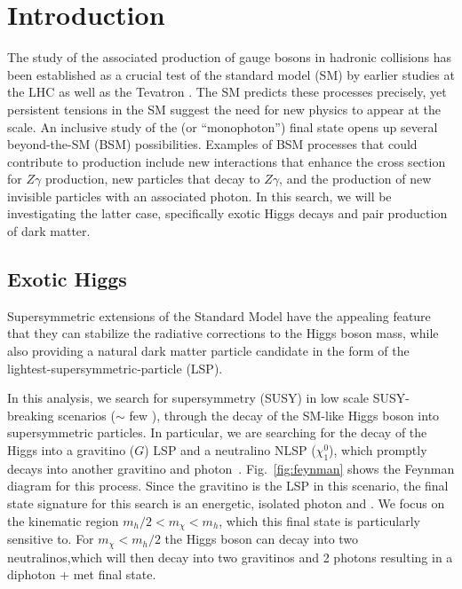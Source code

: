 \section{Introduction}

The study of the associated production of gauge bosons in hadronic collisions has been established as a crucial test of the standard model (SM) by earlier studies at the LHC as well as the Tevatron  \cite{d0zgg,d0zinv,cdfzgam,cmsvgam,cmsvhgam,atlasvgam,atlasww}. The SM predicts these processes precisely, yet persistent tensions in the SM suggest the need for new physics to appear at the \TeV scale. An inclusive study of the \gmet (or ``monophoton'') final state opens up several beyond-the-SM (BSM) possibilities. Examples of BSM processes that could contribute to \gmet production include new interactions that enhance the cross section for $Z\gamma$ production, new particles that decay to $Z\gamma$, and the production of new invisible particles with an associated photon.
In this search, we will be investigating the latter case, specifically exotic Higgs decays and pair production of dark matter.

\subsection{Exotic Higgs}

Supersymmetric extensions of the Standard Model have the appealing feature that they can stabilize the radiative corrections to the Higgs boson mass, while also providing a natural dark matter particle candidate in the form of the lightest-supersymmetric-particle (LSP). 

In this analysis, we search for supersymmetry (SUSY) in low scale SUSY-breaking scenarios ($\sim$ few \TeV), through the decay of the SM-like Higgs boson into supersymmetric particles. In particular, we are searching for the decay of the Higgs into a gravitino ($G$) LSP and a neutralino NLSP ($\chi_{1}^{0}$), which promptly decays into another gravitino and photon~\cite{Petersson:2012dp}. Fig.~\ref{fig:feynman} shows the Feynman diagram for this process.
Since the gravitino is the LSP in this scenario, the final state signature for this search is an energetic, isolated photon and \met.  We focus on the kinematic region $m_{h}/2 < m_{\chi} < m_{h}$, which this final state is particularly sensitive to. For $m_{\chi} < m_{h}/2$ the Higgs boson can decay into two neutralinos,which will then decay into two gravitinos and 2 photons resulting in a diphoton + met final state.

